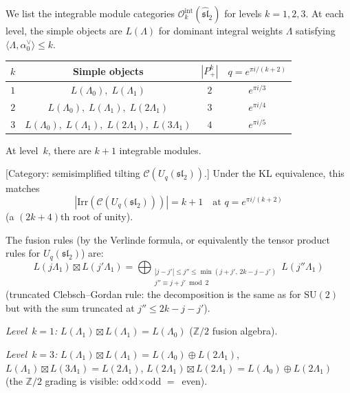 \begin{example}\label{ex:integrable-low-levels}
We list the integrable module categories
$\mathcal{O}_k^{\mathrm{int}}(\widehat{\mathfrak{sl}}_2)$
for levels $k = 1, 2, 3$. At each level, the simple objects are
$L(\Lambda)$ for dominant integral weights $\Lambda$ satisfying
$\langle \Lambda, \alpha_0^\vee \rangle \leq k$.
\begin{center}
\begin{tabular}{cccc}
$k$ & Simple objects & $|P^k_+|$ & $q = e^{\pi i/(k+2)}$ \\
\hline
$1$ & $L(\Lambda_0),\; L(\Lambda_1)$ & $2$ & $e^{\pi i/3}$ \\
$2$ & $L(\Lambda_0),\; L(\Lambda_1),\; L(2\Lambda_1)$ & $3$ &
 $e^{\pi i/4}$ \\
$3$ & $L(\Lambda_0),\; L(\Lambda_1),\; L(2\Lambda_1),\;
 L(3\Lambda_1)$ & $4$ & $e^{\pi i/5}$
\end{tabular}
\end{center}
At level~$k$, there are $k+1$ integrable modules.

\smallskip
\textup{[Category: semisimplified tilting
$\mathcal{C}(U_q(\mathfrak{sl}_2))$.]}
Under the KL equivalence, this matches
\[
|\mathrm{Irr}(\mathcal{C}(U_q(\mathfrak{sl}_2)))| = k+1
\quad\text{at } q = e^{\pi i/(k+2)}
\]
(a $(2k{+}4)$th root of unity).

The fusion rules (by the Verlinde formula, or equivalently the
tensor product rules for $U_q(\mathfrak{sl}_2)$) are:
\[
L(j\Lambda_1) \boxtimes L(j'\Lambda_1)
= \bigoplus_{\substack{|j - j'| \leq j'' \leq
 \min(j+j',\, 2k-j-j') \\ j'' \equiv j + j' \bmod 2}}
 L(j''\Lambda_1)
\]
(truncated Clebsch--Gordan rule: the decomposition is the same
as for $\mathrm{SU}(2)$ but with the sum truncated at $j'' \leq 2k - j - j'$).

\emph{Level~$k = 1$:}
$L(\Lambda_1) \boxtimes L(\Lambda_1) = L(\Lambda_0)$
($\mathbb{Z}/2$ fusion algebra).

\emph{Level~$k = 3$:}
$L(\Lambda_1) \boxtimes L(\Lambda_1)
= L(\Lambda_0) \oplus L(2\Lambda_1)$,
$L(\Lambda_1) \boxtimes L(3\Lambda_1) = L(2\Lambda_1)$,
$L(2\Lambda_1) \boxtimes L(2\Lambda_1) = L(\Lambda_0) \oplus
L(2\Lambda_1)$ (the $\mathbb{Z}/2$ grading is visible: odd$\times$odd
$=$~even).
\end{example}

